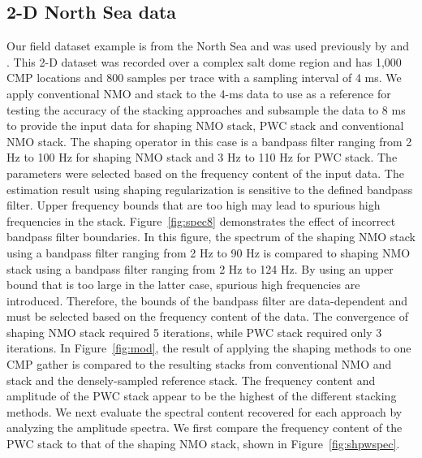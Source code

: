 
\subsection{2-D North Sea data}

Our field dataset example is from the North Sea and was used previously by \cite{fomel4} and \cite{fomel3}. 
This 2-D dataset was recorded over a complex salt dome region and has 1,000 CMP locations and 800 samples 
per trace with a sampling interval of 4 ms. 
We apply conventional NMO and stack to the 4-ms data to use as a reference for testing the accuracy of the stacking 
approaches and subsample the data to 8 ms to provide the input data for shaping NMO stack, PWC stack and conventional NMO stack. 
The shaping operator in this case is a bandpass filter ranging from 2 Hz to 100 Hz for shaping NMO stack and 
3 Hz to 110 Hz for PWC stack. The parameters were selected based on the frequency content of the input data. 
The estimation result using shaping regularization is sensitive to the defined bandpass filter. 
Upper frequency bounds that are too high may lead to spurious high frequencies in the stack. 
Figure~\ref{fig:spec8} demonstrates the effect of incorrect bandpass filter boundaries. 
In this figure, the spectrum of the shaping NMO stack using a bandpass filter ranging from 2 Hz to 90 Hz is compared to 
shaping NMO stack using a bandpass filter ranging from 2 Hz to 124 Hz. By using an upper bound that is too
large in the latter case, spurious high frequencies are introduced. Therefore, the bounds of the bandpass filter
are data-dependent and must be selected based on the frequency content of the data.
The convergence of shaping NMO stack required 5 iterations, while PWC stack required only 3 iterations. 
In Figure~\ref{fig:mod}, the result of applying the shaping methods to one CMP gather is compared to the resulting stacks from conventional
NMO and stack and the densely-sampled reference stack.
The frequency content and amplitude of the PWC stack appear to be the highest of the different stacking methods. We next evaluate the spectral content recovered for each approach by analyzing the amplitude spectra. We first compare the frequency content of the PWC stack to that of the shaping NMO stack, shown in Figure~\ref{fig:shpwspec}. 


